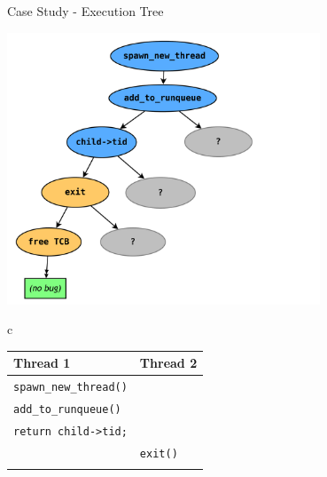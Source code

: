 \documentclass[xcolor=dvipsnames]{beamer}
\begin{document}
\begin{frame}{Case Study - Execution Tree}
	\begin{center}
		\includegraphics[width=0.7\textwidth]{threadfork05.pdf}
		\hspace{-0.5in} {\tiny 
		\begin{tabular}{c}
			\begin{tabular}{|l|l|}
				\hline
				\cellcolor{thread1} {\bf Thread 1} & \cellcolor{thread2} {\bf Thread 2} \\
				\hline
				{\tt spawn\_new\_thread()} & \\
				\hline
				{\tt add\_to\_runqueue()} & \\
				\hline
				{\tt return child->tid;} & \\
				\hline
				& {\tt exit()} \\
				\hline
				& {\tt <free TCB>} \\
				\hline
			\end{tabular}
			\\ \\ \\ \\ \\ \\ \\ \\
			\\ \\ \\ \\ \\ \\ \\ \\
			\\ \\ \\ \\ \\ \\ \\ \\

\end{tabular}}
\end{center}
\end{frame}
\end{document}

